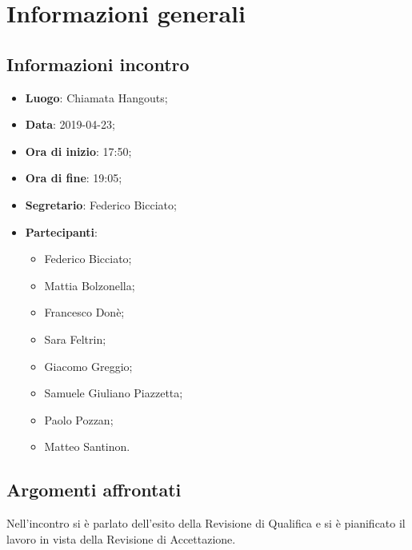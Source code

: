 \section{Informazioni generali}

\subsection{Informazioni incontro}
\begin{itemize}
\item \textbf{Luogo}: Chiamata Hangouts;
\item \textbf{Data}: 2019-04-23;
\item \textbf{Ora di inizio}: 17:50;
\item \textbf{Ora di fine}: 19:05;
\item \textbf{Segretario}: Federico Bicciato;
\item \textbf{Partecipanti}: 
\begin{itemize}
	\item Federico Bicciato;
	\item Mattia Bolzonella;
	\item Francesco Donè;
	\item Sara Feltrin;
	\item Giacomo Greggio;
	\item Samuele Giuliano Piazzetta;
	\item Paolo Pozzan;
	\item Matteo Santinon.
\end{itemize}
\end{itemize}

\subsection{Argomenti affrontati}
Nell'incontro si è parlato dell'esito della Revisione di 
Qualifica e si è pianificato il lavoro in vista della Revisione di Accettazione.

